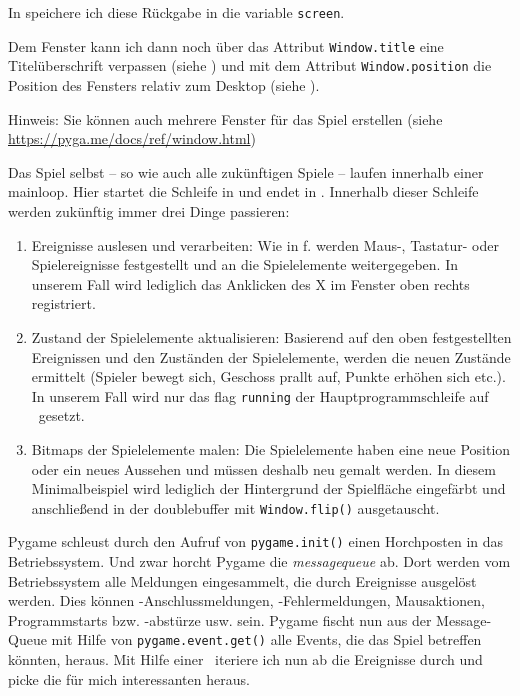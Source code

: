 In  speichere ich diese Rückgabe in die \Gls{variable} \texttt{screen}.

Dem Fenster kann ich dann noch über das Attribut  \texttt{Window.title} eine Titelüberschrift verpassen (siehe ) und mit dem Attribut \texttt{Window.position} die Position des Fensters relativ zum Desktop (siehe ).

Hinweis: Sie können auch mehrere Fenster für das Spiel erstellen (siehe \url{https://pyga.me/docs/ref/window.html})

Das Spiel selbst -- so wie auch alle zukünftigen Spiele -- laufen innerhalb einer \Gls{mainloop}. Hier startet die Schleife in  und endet in . Innerhalb dieser Schleife werden zukünftig immer drei Dinge passieren: 
\begin{enumerate}
	\item Ereignisse auslesen und verarbeiten: Wie in f. werden Maus-, Tastatur- oder Spielereignisse festgestellt und an die Spielelemente weitergegeben. In unserem Fall wird lediglich das Anklicken des X im Fenster oben rechts registriert.  
	\item Zustand der Spielelemente aktualisieren: Basierend auf den oben festgestellten Ereignissen und den Zuständen der Spielelemente, werden die neuen Zustände ermittelt (Spieler bewegt sich, Geschoss prallt auf, Punkte erhöhen sich etc.). In unserem Fall wird nur das \Gls{flag} \texttt{running} der Hauptprogrammschleife auf \false\ gesetzt.
	\item Bitmaps der Spielelemente malen: Die Spielelemente haben eine neue Position oder ein neues Aussehen und müssen deshalb neu gemalt werden. In diesem Minimalbeispiel wird lediglich  der Hintergrund der Spielfläche eingefärbt und anschließend in  der \Gls{doublebuffer} mit \texttt{Window.flip()} ausgetauscht.
\end{enumerate}

Pygame schleust durch den Aufruf von \texttt{py\-game.\-init()} einen Horchposten in das Betriebssystem. Und zwar horcht Pygame die \emph{\Gls{messagequeue}} ab. Dort werden vom Betriebssystem alle Meldungen eingesammelt, die durch Ereignisse ausgelöst werden. Dies können -An\-schluss\-mel\-dungen, -Fehlermeldungen, Mausaktionen, Programmstarts bzw. -abstürze  usw. sein. Pygame fischt nun aus der Message-Queue mit Hilfe von \texttt{pygame.event.get()} alle Events, die das Spiel betreffen könnten, heraus. Mit Hilfe einer \forSchleife\ iteriere ich nun ab  die Ereignisse durch und picke die für mich interessanten heraus. 

